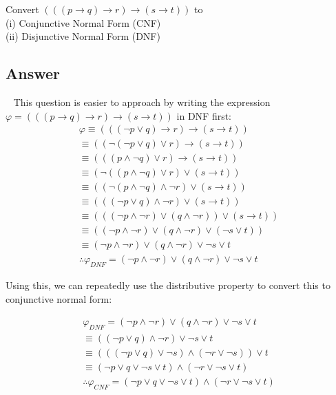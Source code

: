 \documentclass[12pt]{fphw}
\begin{document}
\begin{problem}
  Convert $(((p \to q) \to r) \to (s \to t))$ to \\
  (i) Conjunctive Normal Form (CNF) \\
  (ii) Disjunctive Normal Form (DNF)
\end{problem}

\subsection*{Answer}

\ \newline
This question is easier to approach by writing the expression $\varphi = (((p \to q) \to r) \to (s \to t))$ in DNF first:
\begin{gather*}
  \varphi \equiv (((\neg p \vee q) \to r) \to (s \to t)) \\
  \equiv ((\neg(\neg p \vee q) \vee r) \to (s \to t)) \\
  \equiv (((p \wedge \neg q) \vee r) \to (s \to t)) \\
  \equiv (\neg((p \wedge \neg q) \vee r) \vee (s \to t)) \\
  \equiv ((\neg(p \wedge \neg q) \wedge \neg r) \vee (s \to t)) \\
  \equiv (((\neg p \vee q) \wedge \neg r) \vee (s \to t)) \\
  \equiv (((\neg p \wedge \neg r) \vee (q \wedge \neg r)) \vee (s \to t)) \\
  \equiv ((\neg p \wedge \neg r) \vee (q \wedge \neg r) \vee (\neg s \vee t)) \\
  \equiv (\neg p \wedge \neg r) \vee (q \wedge \neg r) \vee \neg s \vee t \\
  \therefore \varphi_{DNF} = (\neg p \wedge \neg r) \vee (q \wedge \neg r) \vee \neg s \vee t
\end{gather*}

Using this, we can repeatedly use the distributive property to convert this to conjunctive normal form:

\begin{gather*}
  \varphi_{DNF} = (\neg p \wedge \neg r) \vee (q \wedge \neg r) \vee \neg s \vee t \\
  \equiv ((\neg p \vee q) \wedge \neg r) \vee \neg s \vee t \\
  \equiv (((\neg p \vee q) \vee \neg s) \wedge (\neg r \vee \neg s)) \vee t \\
  \equiv (\neg p \vee q \vee \neg s \vee t) \wedge (\neg r \vee \neg s \vee t) \\
  \therefore \varphi_{CNF} = (\neg p \vee q \vee \neg s \vee t) \wedge (\neg r \vee \neg s \vee t)
\end{gather*}
\end{document}
